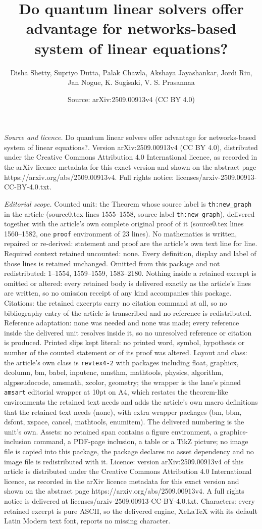\documentclass[10pt,a4paper]{amsart}
\title[Do quantum linear solvers offer advantage for networks-based]{Do quantum linear solvers offer advantage for networks-based system of linear equations?}
\author{Disha Shetty, Supriyo Dutta, Palak Chawla, Akshaya Jayashankar, Jordi Riu, Jan Nogue, K. Sugisaki, V. S. Prasannaa}
\date{Source: arXiv:2509.00913v4 (CC BY 4.0)}
\begin{document}
\maketitle

\noindent\emph{Source and licence.} Do quantum linear solvers offer advantage for networks-based system of linear equations?. Version arXiv:2509.00913v4 (CC BY 4.0), distributed under the Creative Commons Attribution 4.0 International licence, as recorded in the arXiv licence metadata for this exact version and shown on the abstract page https://arxiv.org/abs/2509.00913v4. Full rights notice: licenses/arxiv-2509.00913-CC-BY-4.0.txt.\par\smallskip

\noindent\textit{Editorial scope.} Counted unit: the Theorem whose source label is \texttt{th:new\_graph} in the article (source0.tex lines 1555--1558, source label \texttt{th:new\_graph}), delivered together with the article's own complete original proof of it (source0.tex lines 1560--1582, one \texttt{proof} environment of 23 lines). No mathematics is written, repaired or re-derived: statement and proof are the article's own text line for line. Required context retained uncounted: none. Every definition, display and label of those lines is retained unchanged. Omitted from this package and not redistributed: 1--1554, 1559--1559, 1583--2180. Nothing inside a retained excerpt is omitted or altered: every retained body is delivered exactly as the article's lines are written, so no omission receipt of any kind accompanies this package. Citations: the retained excerpts carry no citation command at all, so no bibliography entry of the article is transcribed and no reference is redistributed. Reference adaptation: none was needed and none was made; every reference inside the delivered unit resolves inside it, so no unresolved reference or citation is produced. Printed slips kept literal: no printed word, symbol, hypothesis or number of the counted statement or of its proof was altered. Layout and class: the article's own class is \texttt{revtex4-2} with packages including float, graphicx, dcolumn, bm, babel, inputenc, amsthm, mathtools, physics, algorithm, algpseudocode, amsmath, xcolor, geometry; the wrapper is the lane's pinned \texttt{amsart} editorial wrapper at 10pt on A4, which restates the theorem-like environments the retained text needs and adds the article's own macro definitions that the retained text needs (none), with extra wrapper packages (bm, bbm, dsfont, xspace, cancel, mathtools, enumitem). The delivered numbering is the unit's own. Assets: no retained span contains a figure environment, a graphics-inclusion command, a PDF-page inclusion, a table or a TikZ picture; no image file is copied into this package, the package declares no asset dependency and no image file is redistributed with it. Licence: version arXiv:2509.00913v4 of this article is distributed under the Creative Commons Attribution 4.0 International licence, as recorded in the arXiv licence metadata for this exact version and shown on the abstract page https://arxiv.org/abs/2509.00913v4. A full rights notice is delivered at licenses/arxiv-2509.00913-CC-BY-4.0.txt. Characters: every retained excerpt is pure ASCII, so the delivered engine, XeLaTeX with its default Latin Modern text font, reports no missing character.
\end{document}
